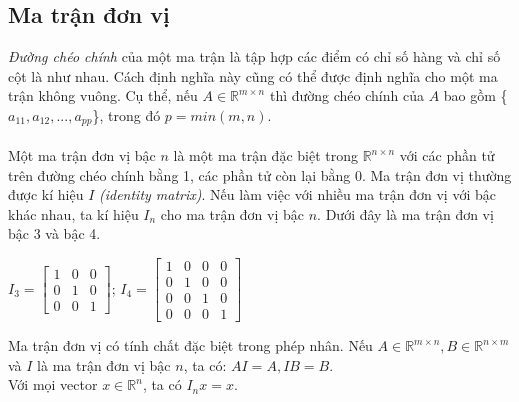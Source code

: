 \documentclass[12pt,a4paper]{report}
\begin{document}
	\subsection{Ma trận đơn vị}
	\textit{Đường chéo chính} của một ma trận là tập hợp các điểm có chỉ số hàng và chỉ số cột là như nhau. Cách định nghĩa này cũng có thể được định nghĩa cho một ma trận không vuông. Cụ thể, nếu $A \in \mathbb{R}^{m \times n}$ thì đường chéo chính của $A$ bao gồm \{$a_{11}, a_{12}, ..., a_{pp}$\}, trong đó $p = min(m,n)$.\\\\
	Một ma trận đơn vị bậc $n$ là một ma trận đặc biệt trong $\mathbb{R}^{n \times n}$ với các phần tử trên đường chéo chính bằng 1, các phần tử còn lại bằng 0. Ma trận đơn vị thường được kí hiệu $I$ \textit{(identity matrix)}. Nếu làm việc với nhiều ma trận đơn vị với bậc khác nhau, ta kí hiệu $I_n$ cho ma trận đơn vị bậc $n$. Dưới đây là ma trận đơn vị bậc 3 và bậc 4.
	\begin{center}
		$I_3 = \begin{bmatrix}
			1&0&0\\0&1&0\\0&0&1
		\end{bmatrix}$; $I_4 = \begin{bmatrix}
			1&0&0&0\\0&1&0&0\\0&0&1&0\\0&0&0&1
		\end{bmatrix}$
	\end{center}
	Ma trận đơn vị có tính chất đặc biệt trong phép nhân. Nếu $A \in \mathbb{R}^{m \times n}, B \in \mathbb{R}^{n \times m}$ và $I$ là ma trận đơn vị bậc $n$, ta có: $AI =A, IB = B$.\\Với mọi vector $x \in \mathbb{R}^n$, ta có $I_nx = x$.
\end{document}
